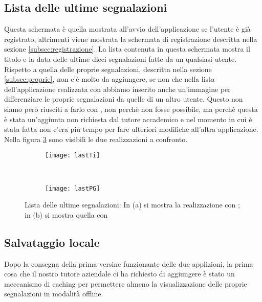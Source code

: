         \subsection{Lista delle ultime segnalazioni}
        Questa schermata è quella mostrata all'avvio dell'applicazione se
        l'utente è già registrato, altrimenti viene mostrata la schermata di
        registrazione descritta nella sezione \ref{subsec:registrazione}.
        La lista contenuta in questa schermata mostra il titolo e la data delle
        ultime dieci segnalazioni
        fatte da un qualsiasi utente. Rispetto a quella delle proprie
        segnalazioni, descritta nella sezione \ref{subsec:proprie}, non c'è
        molto da aggiungere, se non che nella lista dell'applicazione
        realizzata con \tisdk{} abbiamo inserito anche un'immagine per
        differenziare le proprie segnalazioni da quelle di un altro utente.
        Questo non siamo però riusciti a farlo con \kendomob{}, non perchè 
        non fosse possibile, ma perchè questa è stata un'aggiunta non richiesta 
        dal tutore accademico e nel momento in cui è stata fatta non c'era 
        più tempo per fare ulteriori modifiche all'altra applicazione. 
        Nella figura
        \ref{fig:last} sono visibili le due realizzazioni a confronto.
        
        \begin{figure}[h]
			\centering
			\begin{subfigure}[b]{0.485\textwidth}
				\texttt{[image: lastTi]}
				\caption{}
				\label{fig:tiLast}
			\end{subfigure}
			~
			\begin{subfigure}[b]{0.485\textwidth}
				\texttt{[image: lastPG]}
				\caption{}
				\label{fig:kendoLast}
			\end{subfigure}
			\caption{Lista delle ultime segnalazioni: 
			In (a) si mostra la realizzazione con \tisdk{}; in (b) si mostra
			quella con \kendomob{}
			}
			\label{fig:last}
		\end{figure}

        
        \subsection{Salvataggio locale}
        \label{subsec:caching}
            Dopo la consegna della prima versine funzionante delle due
            applizioni, la prima cosa che il nostro tutore aziendale ci ha
            richiesto di aggiungere è stato un meccanismo di caching per
            permettere almeno la visualizzazione delle proprie segnalazioni in
            modalità offline.

